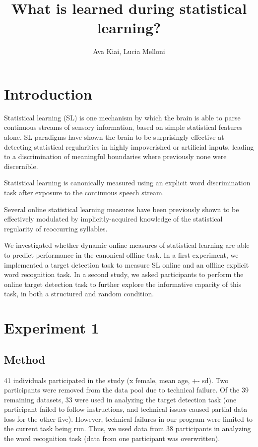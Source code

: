 \documentclass[11pt]{article}
\title{What is learned during statistical learning? }
\author{Ava Kiai, Lucia Melloni}
\date{}
\begin{document}
\maketitle

\begin{abstract}

\end{abstract}

\tableofcontents

\section{Introduction}
Statistical learning (SL) is one mechanism by which the brain is able to parse 
continuous streams of sensory information, based on simple statistical features 
alone. \cite{Dehaene2015} SL paradigms have shown the brain to be surprisingly 
effective at detecting statistical regularities in highly impoverished or artificial 
inputs, leading to a discrimination of meaningful boundaries where previously 
none were discernible. \cite{Pelucchi2009, RichardN.Aslin1998, Turk-Browne2005, Turk-Browne2008}

Statistical learning is canonically measured using an explicit word discrimination 
task after exposure to the continuous speech stream. 

Several online statistical learning measures have been previously shown to be 
effectively modulated by implicitly-acquired knowledge of the statistical regularity 
of reoccurring syllables. 

We investigated whether dynamic online measures of statistical learning are able to 
predict performance in the canonical offline task. In a first experiment, we 
implemented a target detection task to measure SL online and an offline explicit 
word recognition task. In a second study, we asked participants to perform the 
online target detection task to further explore the informative capacity of this 
task, in both a structured and random condition.

\section{Experiment 1}
\subsection{Method}
41 individuals participated in the study (x female, mean age, +- sd). Two participants 
were removed from the data pool due to technical failure. Of the 39 remaining
datasets, 33 were used in analyzing the target detection task (one participant failed 
to follow instructions, and technical issues caused partial data loss for the other 
five). However, technical failures in our program were limited to the current task 
being run. Thus, we used data from 38 participants in analyzing the word recognition 
task (data from one participant was overwritten).  
\end{document}
